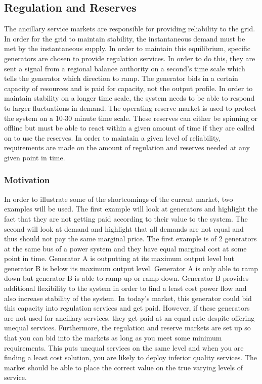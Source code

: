 \subsection{Regulation and Reserves}
The ancillary service markets are responsible for providing reliability to the grid.  In order for the grid to maintain stability, the instantaneous demand must be met by the instantaneous supply.  In order to maintain this equilibrium, specific generators are chosen to provide regulation services.  In order to do this, they are sent a signal from a regional balance authority on a second’s time scale which tells the generator which direction to ramp.  The generator bids in a certain capacity of resources and is paid for capacity, not the output profile.  In order to maintain stability on a longer time scale, the system needs to be able to respond to larger fluctuations in demand.  The operating reserve market is used to protect the system on a 10-30 minute time scale.  These reserves can either be spinning or offline but must be able to react within a given amount of time if they are called on to use the reserves.  In order to maintain a given level of reliability, requirements are made on the amount of regulation and reserves needed at any given point in time.

\subsubsection{Motivation}
In order to illustrate some of the shortcomings of the current market, two examples will be used.  The first example will look at generators and highlight the fact that they are not getting paid according to their value to the system.  The second will look at demand and highlight that all demands are not equal and thus should not pay the same marginal price.
The first example is of 2 generators at the same bus of a power system and they have equal marginal cost at some point in time.  Generator A is outputting at its maximum output level but generator B is below its maximum output level.  Generator A is only able to ramp down but generator B is able to ramp up or ramp down.  Generator B provides additional flexibility to the system in order to find a least cost power flow and also increase stability of the system.  In today’s market, this generator could bid this capacity into regulation services and get paid.  However, if these generators are not used for ancillary services, they get paid at an equal rate despite offering unequal services.   Furthermore, the regulation and reserve markets are set up so that you can bid into the markets as long as you meet some minimum requirements.  This puts unequal services on the same level and when you are finding a least cost solution, you are likely to deploy inferior quality services.  The market should be able to place the correct value on the true varying levels of service.

